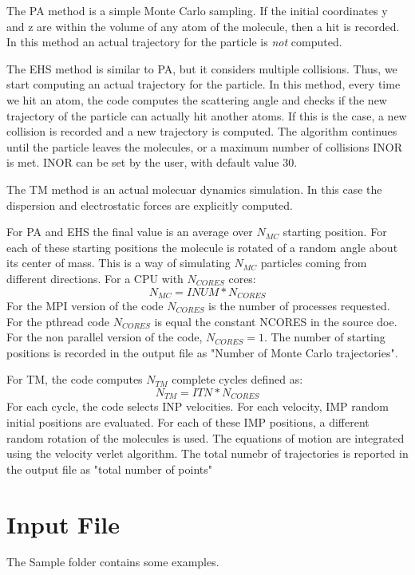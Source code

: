 \documentclass[letter,12pt]{article}
\begin{document}
The PA method is a simple Monte Carlo sampling. If the initial coordinates y and z are within the volume
of any atom of the molecule, then a hit is recorded. 
In this method an actual trajectory for the particle is \textsl{not} computed.

The EHS method is similar to PA, but it considers multiple collisions. Thus, we start computing an actual trajectory
for the particle. In this method, every time we hit an atom, the code computes the scattering angle and checks if the
new trajectory of the particle can actually hit another atoms. If this is the case, a new collision is recorded and a new
trajectory is computed. The algorithm continues until the particle leaves the molecules, or a maximum number of collisions 
INOR is met. INOR can be set by the user, with default value 30. 

The TM method is an actual molecuar dynamics simulation. In this case the dispersion and electrostatic forces are explicitly
computed.

For PA and EHS the final value is an average over $N_{MC}$ starting position. For each of these starting positions the molecule is 
rotated of a random angle about its center of mass. This is a way of simulating $N_{MC}$ particles coming from different directions.
For a CPU with $N_{CORES}$ cores:
\begin{equation}
    N_{MC}= INUM * N_{CORES}
\end{equation}
For the MPI version of the code $N_{CORES}$ is the number of processes requested. For the pthread code $N_{CORES}$ is equal the
constant NCORES in the source doe. For the non parallel version of the code, $N_{CORES}=1$.
The number of starting positions is recorded in the output file as "Number of Monte Carlo trajectories".

For TM, the code computes $N_{TM}$ complete cycles defined as:
\begin{equation}
    N_{TM}= ITN * N_{CORES}
\end{equation}
For each cycle, the code selects INP velocities. For each velocity, IMP random initial positions are evaluated. 
For each  of these IMP positions, a different random rotation of the molecules is used.
The equations of motion are integrated using the velocity verlet algorithm.
The total numebr of trajectories is reported in the output file as "total number of points"

\section{Input File}
The Sample folder contains some examples.
\end{document}
